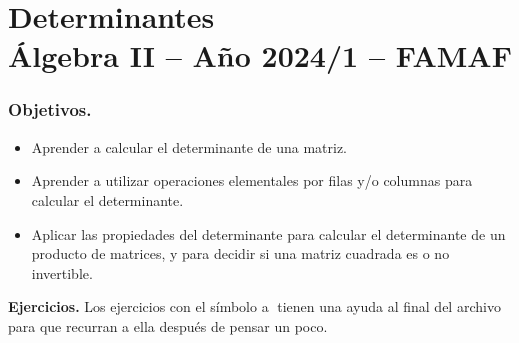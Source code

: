 \chapter{Determinantes\\Álgebra  II -- Año 2024/1 -- FAMAF}\label{practico-4}
    


\subsection*{Objetivos.}

\begin{itemize}
\item Aprender a calcular el determinante de una matriz.

\item Aprender a utilizar operaciones elementales por filas y/o columnas para calcular el determinante.

\item Aplicar las propiedades del determinante para calcular el determinante de un producto de matrices, y para decidir si una matriz cuadrada es o no invertible.
\end{itemize}
		

\noindent \textbf{Ejercicios.} Los ejercicios con el símbolo \textcircled{a} tienen una ayuda al final del archivo para que recurran a ella después de pensar un poco.

